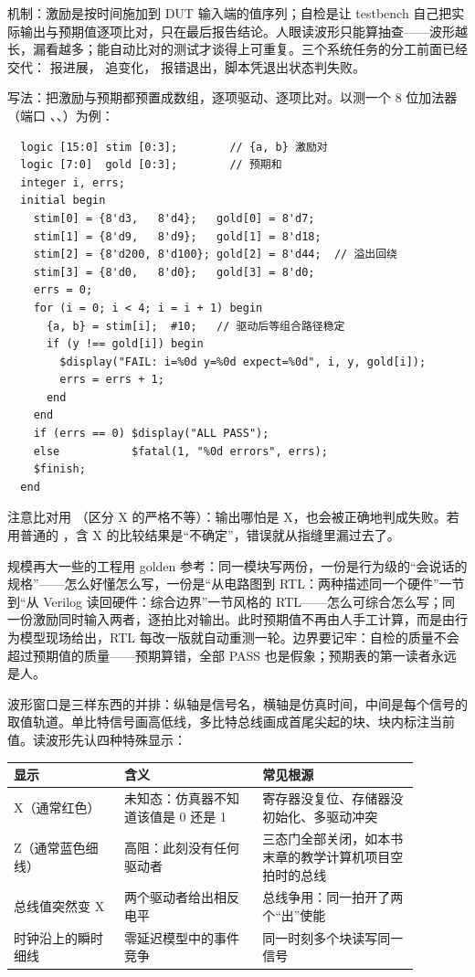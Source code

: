 机制：激励是按时间施加到 DUT 输入端的值序列；自检是让 testbench 自己把实际输出与预期值逐项比对，只在最后报告结论。人眼读波形只能算抽查——波形越长，漏看越多；能自动比对的测试才谈得上可重复。三个系统任务的分工前面已经交代： 报进展， 追变化， 报错退出，脚本凭退出状态判失败。

写法：把激励与预期都预置成数组，逐项驱动、逐项比对。以测一个 8 位加法器（端口 、、）为例：

\begin{lstlisting}
  logic [15:0] stim [0:3];        // {a, b} 激励对
  logic [7:0]  gold [0:3];        // 预期和
  integer i, errs;
  initial begin
    stim[0] = {8'd3,   8'd4};   gold[0] = 8'd7;
    stim[1] = {8'd9,   8'd9};   gold[1] = 8'd18;
    stim[2] = {8'd200, 8'd100}; gold[2] = 8'd44;  // 溢出回绕
    stim[3] = {8'd0,   8'd0};   gold[3] = 8'd0;
    errs = 0;
    for (i = 0; i < 4; i = i + 1) begin
      {a, b} = stim[i];  #10;   // 驱动后等组合路径稳定
      if (y !== gold[i]) begin
        $display("FAIL: i=%0d y=%0d expect=%0d", i, y, gold[i]);
        errs = errs + 1;
      end
    end
    if (errs == 0) $display("ALL PASS");
    else           $fatal(1, "%0d errors", errs);
    $finish;
  end
\end{lstlisting}

注意比对用 \code{!==}（区分 X 的严格不等）：输出哪怕是 X，也会被正确地判成失败。若用普通的 \code{!=}，含 X 的比较结果是“不确定”，错误就从指缝里漏过去了。

规模再大一些的工程用 golden 参考：同一模块写两份，一份是行为级的“会说话的规格”——怎么好懂怎么写，一份是“从电路图到 RTL：两种描述同一个硬件”一节到“从 Verilog 读回硬件：综合边界”一节风格的 RTL——怎么可综合怎么写；同一份激励同时输入两者，逐拍比对输出。此时预期值不再由人手工计算，而是由行为模型现场给出，RTL 每改一版就自动重测一轮。边界要记牢：自检的质量不会超过预期值的质量——预期算错，全部 PASS 也是假象；预期表的第一读者永远是人。

波形窗口是三样东西的并排：纵轴是信号名，横轴是仿真时间，中间是每个信号的取值轨道。单比特信号画高低线，多比特总线画成首尾尖起的块、块内标注当前值。读波形先认四种特殊显示：

\begin{longtable}{L{0.24\linewidth}L{0.3\linewidth}L{0.34\linewidth}}
\toprule
显示 & 含义 & 常见根源 \\
\midrule
X（通常红色） & 未知态：仿真器不知道该值是 0 还是 1 & 寄存器没复位、存储器没初始化、多驱动冲突 \\\tablerowrule
Z（通常蓝色细线） & 高阻：此刻没有任何驱动者 & 三态门全部关闭，如本书末章的教学计算机项目空拍时的总线 \\\tablerowrule
总线值突然变 X & 两个驱动者给出相反电平 & 总线争用：同一拍开了两个“出”使能 \\\tablerowrule
时钟沿上的瞬时细线 & 零延迟模型中的事件竞争 & 同一时刻多个块读写同一信号 \\
\bottomrule
\end{longtable}

